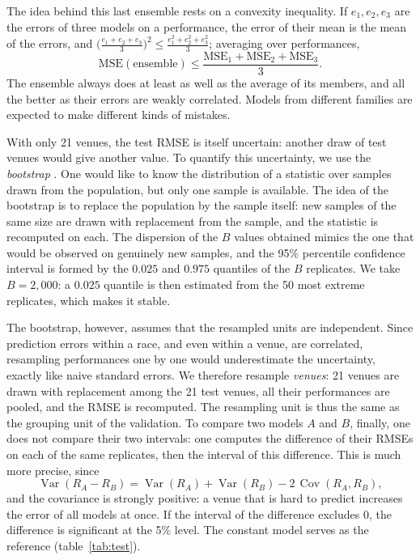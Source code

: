 \documentclass[11pt,a4paper]{article}
\DeclareMathOperator{\Var}{Var}
\DeclareMathOperator{\Cov}{Cov}
\begin{document}
The idea behind this last ensemble rests on a convexity inequality. If $e_1, e_2, e_3$ are the errors of three models
on a performance, the error of their mean is the mean of the errors, and
$\big(\frac{e_1 + e_2 + e_3}{3}\big)^2 \leq \frac{e_1^2 + e_2^2 + e_3^2}{3}$; averaging over performances,
\[
\mathrm{MSE}(\text{ensemble}) \leq \frac{\mathrm{MSE}_1 + \mathrm{MSE}_2 + \mathrm{MSE}_3}{3} .
\]
The ensemble always does at least as well as the average of its members, and all the better as their errors are weakly
correlated. Models from different families are expected to make different kinds of mistakes.

With only 21 venues, the test RMSE is itself uncertain: another draw of test venues would give another value. To
quantify this uncertainty, we use the \emph{bootstrap} \citep{efron1979}. One would like to know the distribution of a
statistic over samples drawn from the population, but only one sample is available. The idea of the bootstrap is to
replace the population by the sample itself: new samples of the same size are drawn with replacement from the sample,
and the statistic is recomputed on each. The dispersion of the $B$ values obtained mimics the one that would be observed
on genuinely new samples, and the 95\% percentile confidence interval is formed by the $0.025$ and $0.975$ quantiles of
the $B$ replicates. We take $B = 2{,}000$: a $0.025$ quantile is then estimated from the 50 most extreme replicates,
which makes it stable.

The bootstrap, however, assumes that the resampled units are independent. Since prediction errors within a race, and
even within a venue, are correlated, resampling performances one by one would underestimate the uncertainty, exactly
like naive standard errors. We therefore resample \emph{venues}: 21 venues are drawn with replacement among the 21 test
venues, all their performances are pooled, and the RMSE is recomputed. The resampling unit is thus the same as the
grouping unit of the validation. To compare two models $A$ and $B$, finally, one does not compare their two intervals:
one computes the difference of their RMSEs on each of the same replicates, then the interval of this difference. This
is much more precise, since
\[
\Var(R_A - R_B) = \Var(R_A) + \Var(R_B) - 2\,\Cov(R_A, R_B),
\]
and the covariance is strongly positive: a venue that is hard to predict increases the error of all models at once. If
the interval of the difference excludes 0, the difference is significant at the 5\% level. The constant model serves as
the reference (table~\ref{tab:test}).
\end{document}
